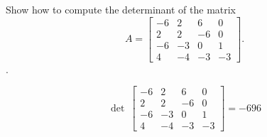 
\begin{exerciseStatement}


Show how to compute the determinant of the matrix \[A= \left[\begin{array}{cccc}
-6 & 2 & 6 & 0 \\
2 & 2 & -6 & 0 \\
-6 & -3 & 0 & 1 \\
4 & -4 & -3 & -3
\end{array}\right] .\].


\end{exerciseStatement}
    
\begin{exerciseAnswer} 
\[\operatorname{det}\  \left[\begin{array}{cccc}
-6 & 2 & 6 & 0 \\
2 & 2 & -6 & 0 \\
-6 & -3 & 0 & 1 \\
4 & -4 & -3 & -3
\end{array}\right] = -696 \]
\end{exerciseAnswer}
    
